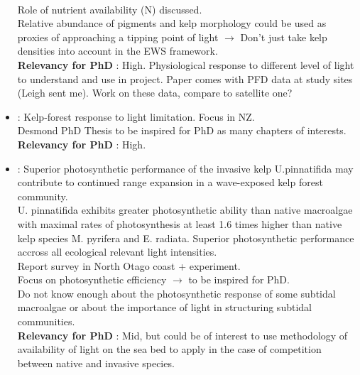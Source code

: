 \documentclass[]{report}
\begin{document}
\begin{itemize}
		\\Role of nutrient availability (N) discussed. 
		\\Relative abundance of pigments and kelp morphology could be used as proxies of approaching a tipping point of light $\rightarrow$ Don't just take kelp densities into account in the EWS framework.
		\\\textbf{Relevancy for PhD} : High. Physiological response to different level of light to understand and use in project. Paper comes with PFD data at study sites (Leigh sent me). Work on these data, compare to satellite one?	
			
			
		\item \cite{desmond2017kelp} : Kelp-forest response to light limitation. Focus in NZ.
		\\ Desmond PhD Thesis to be inspired for PhD as many chapters of interests.
		\\\textbf{Relevancy for PhD} : High. 
		
				
		\item \cite{desmond2019superior} : Superior photosynthetic performance of the invasive kelp U.pinnatifida may contribute to continued range expansion in a wave-exposed kelp forest community.
		\\ U. pinnatifida exhibits greater photosynthetic ability than native macroalgae with maximal rates of photosynthesis at least 1.6 times higher than native kelp species M. pyrifera and E. radiata. Superior photosynthetic performance accross all ecological relevant light intensities.
		\\Report survey in North Otago coast + experiment.
		\\Focus on photosynthetic efficiency $\rightarrow$ to be inspired for PhD.
		\\ Do not know enough about the photosynthetic response of some subtidal macroalgae or about the importance of light in structuring subtidal communities.
		\\\textbf{Relevancy for PhD} : Mid, but could be of interest to use methodology of availability of light on the sea bed to apply in the case of competition between native and invasive species. 
		

\end{itemize}
\end{document}
